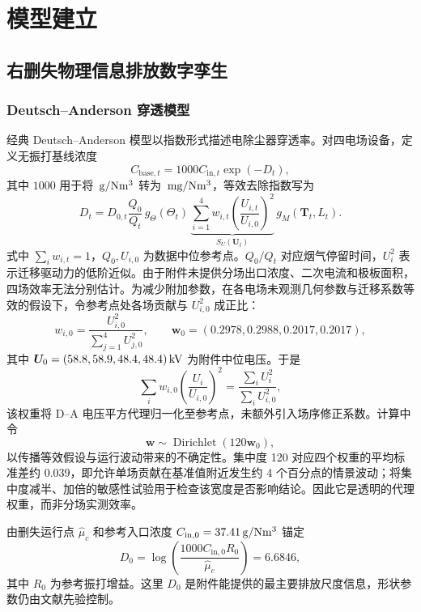 \section{模型建立}

\subsection{右删失物理信息排放数字孪生}

\subsubsection{Deutsch--Anderson 穿透模型}

经典 Deutsch--Anderson 模型以指数形式描述电除尘器穿透率\cite{nichols1972epa,white1963esp}。对四电场设备，定义无振打基线浓度
\begin{equation}
C_{\mathrm{base},t}=1000C_{\mathrm{in},t}\exp(-D_t),
\label{eq:basec}
\end{equation}
其中 $1000$ 用于将 $\,\mathrm{g/Nm^3}$ 转为 $\,\mathrm{mg/Nm^3}$，等效去除指数写为
\begin{equation}
D_t=D_{0,t}\frac{Q_0}{Q_t}\,g_\Theta(\Theta_t)\,
\underbrace{\sum_{i=1}^{4}w_{i,t}\left(\frac{U_{i,t}}{U_{i,0}}\right)^2}_{S_U(\bm U_t)}
\,g_M(\bm T_t,L_t).
\label{eq:dindex}
\end{equation}
式中 $\sum_iw_{i,t}=1$，$Q_0,U_{i,0}$ 为数据中位参考点。$Q_0/Q_t$ 对应烟气停留时间，$U_i^2$ 表示迁移驱动力的低阶近似。由于附件未提供分场出口浓度、二次电流和极板面积，四场效率无法分别估计。为减少附加参数，在各电场未观测几何参数与迁移系数等效的假设下，令参考点处各场贡献与 $U_{i,0}^2$ 成正比：
\begin{equation}
 w_{i,0}=\frac{U_{i,0}^2}{\sum_{j=1}^{4}U_{j,0}^2},\qquad
\bm w_0=(0.2978,0.2988,0.2017,0.2017),
\label{eq:weights}
\end{equation}
其中 $\bm U_0=(58.8,58.9,48.4,48.4)\,\mathrm{kV}$ 为附件中位电压。于是
\[
\sum_iw_{i,0}\left(\frac{U_i}{U_{i,0}}\right)^2
=\frac{\sum_iU_i^2}{\sum_iU_{i,0}^2},
\]
该权重将 D--A 电压平方代理归一化至参考点，未额外引入场序修正系数。计算中令
\[
\bm w\sim\operatorname{Dirichlet}(120\bm w_0),
\]
以传播等效假设与运行波动带来的不确定性。集中度 120 对应四个权重的平均标准差约 0.039，即允许单场贡献在基准值附近发生约 4 个百分点的情景波动；将集中度减半、加倍的敏感性试验用于检查该宽度是否影响结论。因此它是透明的代理权重，而非分场实测效率。

由删失运行点 $\hat\mu_c$ 和参考入口浓度 $C_{\mathrm{in},0}=37.41\,\mathrm{g/Nm^3}$ 锚定
\begin{equation}
D_0=\log\left(\frac{1000C_{\mathrm{in},0}R_0}{\hat\mu_c}\right)=6.6846,
\label{eq:dref}
\end{equation}
其中 $R_0$ 为参考振打增益。这里 $D_0$ 是附件能提供的最主要排放尺度信息，形状参数仍由文献先验控制。

